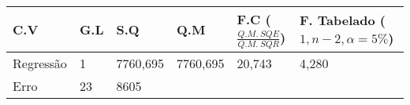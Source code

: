 \documentclass[
  openany]{book}
\begin{document}
\begin{longtable}[]{@{}llllll@{}}
\toprule
\begin{minipage}[b]{0.14\columnwidth}\raggedright
C.V\strut
\end{minipage} & \begin{minipage}[b]{0.14\columnwidth}\raggedright
G.L\strut
\end{minipage} & \begin{minipage}[b]{0.14\columnwidth}\raggedright
S.Q\strut
\end{minipage} & \begin{minipage}[b]{0.14\columnwidth}\raggedright
Q.M\strut
\end{minipage} & \begin{minipage}[b]{0.14\columnwidth}\raggedright
F.C (\(\frac{Q.M. \  SQE}{Q.M.\ SQR}\))\strut
\end{minipage} & \begin{minipage}[b]{0.14\columnwidth}\raggedright
F. Tabelado (\(1,n-2,\alpha=5\%\))\strut
\end{minipage}\tabularnewline
\midrule
\endhead
\begin{minipage}[t]{0.14\columnwidth}\raggedright
Regressão\strut
\end{minipage} & \begin{minipage}[t]{0.14\columnwidth}\raggedright
1\strut
\end{minipage} & \begin{minipage}[t]{0.14\columnwidth}\raggedright
7760,695\strut
\end{minipage} & \begin{minipage}[t]{0.14\columnwidth}\raggedright
7760,695\strut
\end{minipage} & \begin{minipage}[t]{0.14\columnwidth}\raggedright
20,743\strut
\end{minipage} & \begin{minipage}[t]{0.14\columnwidth}\raggedright
4,280\strut
\end{minipage}\tabularnewline
\begin{minipage}[t]{0.14\columnwidth}\raggedright
Erro\strut
\end{minipage} & \begin{minipage}[t]{0.14\columnwidth}\raggedright
23\strut
\end{minipage} & \begin{minipage}[t]{0.14\columnwidth}\raggedright
8605\strut
\end{minipage} & \begin{minipage}[t]{0.14\columnwidth}\raggedright

\end{minipage}
\end{longtable}
\end{document}
